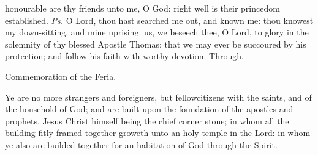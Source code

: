 \properantiphonfix

\introit
{} honourable are thy friends unto me, O God: right well is their princedom established. \textit{Ps.} O Lord, thou hast searched me out, and known me: thou knowest my down-sitting, and mine uprising.
\collect
 us, we beseech thee, O Lord, to glory in the solemnity of thy blessed Apostle Thomas: that we may ever be succoured by his protection; and follow his faith with worthy devotion. Through.

\begin{rubric}
    Commemoration of the Feria.
\end{rubric}

 Ye are no more strangers and foreigners, but fellowcitizens with the saints, and of the household of God; and are built upon the foundation of the apostles and prophets, Jesus Christ himself being the chief corner stone; in whom all the building fitly framed together groweth unto an holy temple in the Lord: in whom ye also are builded together for an habitation of God through the Spirit.


